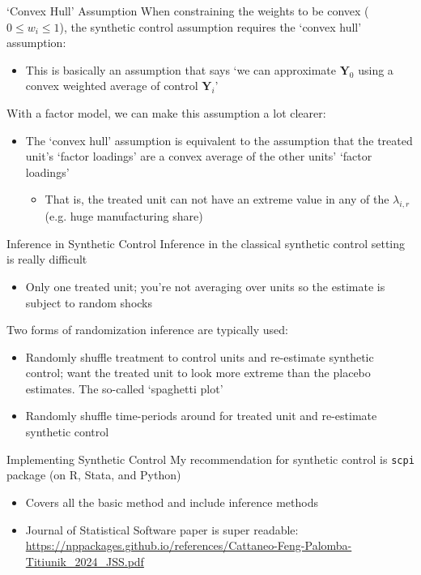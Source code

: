 \documentclass[aspectratio=169,t,11pt,table]{beamer}
\begin{document}
\begin{frame}{`Convex Hull' Assumption}
  When constraining the weights to be convex ($0 \leq w_i \leq 1$), the synthetic control assumption requires the `convex hull' assumption:
  \begin{itemize}
    \item This is basically an assumption that says `we can approximate $\bm{Y}_{0}$ using a convex weighted average of control $\bm{Y}_i$'
  \end{itemize}

  \pause
  \bigskip
  With a factor model, we can make this assumption a lot clearer:
  \begin{itemize}
    \item The `convex hull' assumption is equivalent to the assumption that the treated unit's `factor loadings' are a convex average of the other units' `factor loadings'
    \begin{itemize}
      \item That is, the treated unit can not have an extreme value in any of the $\lambda_{i,r}$ (e.g. huge manufacturing share)
    \end{itemize}
  \end{itemize}
\end{frame}

\begin{frame}{Inference in Synthetic Control}
  Inference in the classical synthetic control setting is really difficult
  \begin{itemize}
    \item Only one treated unit; you're not averaging over units so the estimate is subject to random shocks
  \end{itemize}

  \pause
  \bigskip
  Two forms of randomization inference are typically used:
  \begin{itemize}
    \item Randomly shuffle treatment to control units and re-estimate synthetic control; want the treated unit to look more extreme than the placebo estimates. The so-called `spaghetti plot'
    
    \item Randomly shuffle time-periods around for treated unit and re-estimate synthetic control
  \end{itemize}
\end{frame}

\begin{frame}{Implementing Synthetic Control}
  My recommendation for synthetic control is \texttt{scpi} package (on R, Stata, and Python)
  \begin{itemize}
    \item Covers all the basic method and include inference methods

    \item Journal of Statistical Software paper is super readable: \url{https://nppackages.github.io/references/Cattaneo-Feng-Palomba-Titiunik_2024_JSS.pdf}
  \end{itemize}

\end{frame}
\end{document}
